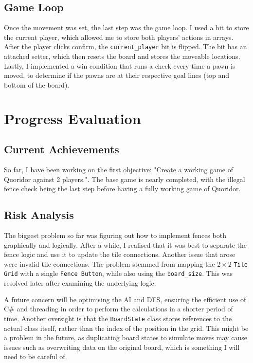 \documentclass[progress]{cmpreport}
\begin{document}
\subsection{Game Loop}
Once the movement was set, the last step was the game loop. I used a bit to store the current player, which allowed me to store both players' actions in arrays. After the player clicks confirm, the \texttt{current\_player} bit is flipped. The bit has an attached setter, which then resets the board and stores the moveable locations. Lastly, I implemented a win condition that runs a check every time a pawn is moved, to determine if the pawns are at their respective goal lines (top and bottom of the board).

\section{Progress Evaluation}

\subsection{Current Achievements}
So far, I have been working on the first objective: "Create a working game of Quoridor against 2 players.". The base game is nearly completed, with the illegal fence check being the last step before having a fully working game of Quoridor.

\subsection{Risk Analysis}
The biggest problem so far was figuring out how to implement fences both graphically and logically. After a while, I realised that it was best to separate the fence logic and use it to update the tile connections. Another issue that arose were invalid tile connections. The problem stemmed from mapping the \(2 \times 2\) \texttt{Tile Grid} with a single \texttt{Fence Button}, while also using the \texttt{board\_size}. This was resolved later after examining the underlying logic.  

\noindent A future concern will be optimising the AI and DFS, ensuring the efficient use of C\# and threading in order to perform the calculations in a shorter period of time. Another oversight is that the \texttt{BoardState} class stores references to the actual class itself, rather than the index of the position in the grid. This might be a problem in the future, as duplicating board states to simulate moves may cause issues such as overwriting data on the original board, which is something I will need to be careful of.
\end{document}
